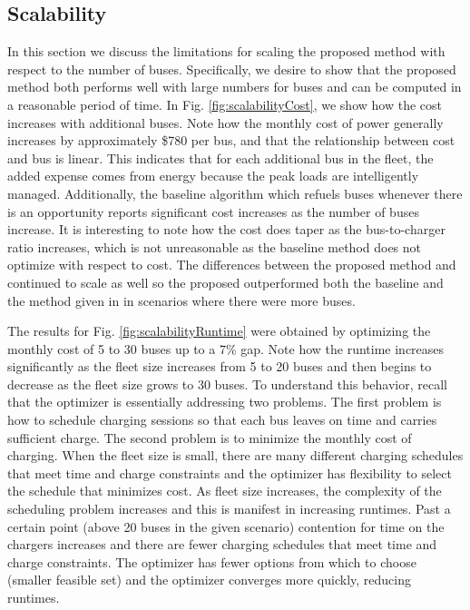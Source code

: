 \subsection{Scalability\label{sec:results:scalability}}


In this section we discuss the limitations for scaling the proposed method with respect to the number of buses. Specifically, we desire to show that the proposed method both performs well with large numbers for buses and can be computed in a reasonable period of time. In Fig. \ref{fig:scalabilityCost}, we show how the cost increases with additional buses. Note how the monthly cost of power generally increases by approximately \$780 per bus, and that the relationship between cost and bus is linear. This indicates that for each additional bus in the fleet, the added expense comes from energy because the peak loads are intelligently managed. Additionally, the baseline algorithm which refuels buses whenever there is an opportunity reports significant cost increases as the number of buses increase. It is interesting to note how the cost does taper as the bus-to-charger ratio increases, which is not unreasonable as the baseline method does not optimize with respect to cost. The differences between the proposed method and \cite{He_2019_Fast} continued to scale as well so the proposed outperformed both the baseline and the method given in \cite{He_2019_Fast} in scenarios where there were more buses. 
\par The results for Fig. \ref{fig:scalabilityRuntime} were obtained by optimizing the monthly cost of 5 to 30 buses up to a 7\% gap.  Note how the runtime increases significantly as the fleet size increases from 5 to 20 buses and then begins to decrease as the fleet size grows to 30 buses.  To understand this behavior, recall that the optimizer is essentially addressing two problems. The first problem is how to schedule charging sessions so that each bus leaves on time and carries sufficient charge. The second problem is to minimize the monthly cost of charging. When the fleet size is small, there are many different charging schedules that meet time and charge constraints and the optimizer has flexibility to select the schedule that minimizes cost. As fleet size increases, the complexity of the scheduling problem increases and this is manifest in increasing runtimes.  Past a certain point (above 20 buses in the given scenario) contention for time on the chargers increases and there are fewer charging schedules that meet time and charge constraints.  The optimizer has fewer options from which to choose (smaller feasible set) and the optimizer converges more quickly, reducing runtimes.
